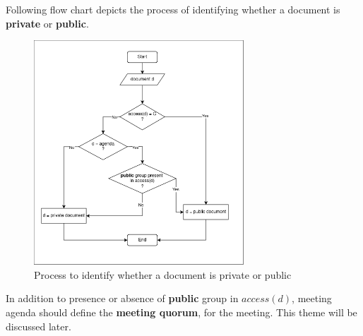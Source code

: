 \documentclass{article}
\begin{document}
\noindent
Following flow chart depicts the process of identifying whether a document is \textbf{private} or \textbf{public}.
\begin{figure}[H]
    \centering
    \includegraphics[width=0.7\textwidth]{./image/document_Aug_22.png}
    \caption{Process to identify whether a document is private or public}
    \label{fig:sample}
\end{figure} 

\noindent
In addition to presence or absence of \textbf{public} group in $access(d)$, meeting agenda should define the \textbf{meeting quorum}, for the meeting. This theme will be discussed later.

\end{document}
